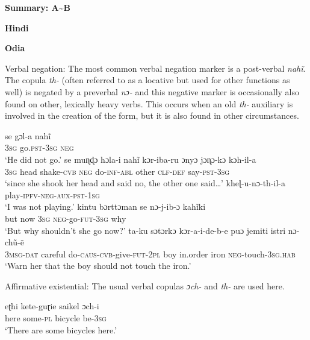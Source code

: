 \documentclass[output=paper]{langsci/langscibook}
\begin{document}
\begin{unindented}
\textbf{Summary: A{\textasciitilde}B}

\textbf{Hindi} \parencite[see][]{Bashir2006}

\textbf{Odia} \parencite{NeukomPatnaik2003}

Verbal negation: The most common verbal negation marker is a post-verbal \textit{nahĩ}. The copula \textit{th-} (often referred to as a locative but used for other functions as well) is negated by a preverbal \textit{nɔ-} and this negative marker is occasionally also found on other, lexically heavy verbs. This occurs when an old \textit{th-} auxiliary is involved in the creation of the form, but it is also found in other circumstances.
%
\begin{exe}\ex \gll se gɔl-a nahĩ \\
\textsc{3sg}   go.\textsc{pst-3sg}  \textsc{neg} \\
    \glt `He did not go.' \parencite[340]{NeukomPatnaik2003}
\ex \gll se muɳɖɔ hɔla-i nahĩ kɔr-iba-ru ɔnyɔ jɔɳɔ-kɔ kɔh-il-a \\
\textsc{3sg} head shake-\textsc{cvb} \textsc{neg} do-\textsc{inf-abl} other \textsc{clf-def} say-\textsc{pst-3sg} \\
    \glt `since she shook her head and said no, the other one
said…'\parencite[43]{NeukomPatnaik2003}
\ex \gll kheɭ-u-nɔ-th-il-a \\
play-\textsc{ipfv-neg-aux-pst-1sg} \\
    \glt `I was not playing.' \parencite[340]{NeukomPatnaik2003}
\ex \gll kintu bɔrttɔman se nɔ-j-ib-ɔ kahĩki \\
but now \textsc{3sg} \textsc{neg}-go-\textsc{fut-3sg} why \\
    \glt `But why shouldn't she go now?’ \parencite[341]{NeukomPatnaik2003}
\ex \gll ta-ku sɔtɔrkɔ kɔr-a-i-de-b-e puɔ jemiti istri nɔ-chũ-ẽ\\
\textsc{3msg-dat} careful do-\textsc{caus-cvb}-give-\textsc{fut-2pl} boy in.order iron \textsc{neg}-touch-\textsc{3sg.hab} \\
    \glt `Warn her that the boy should not touch the iron.' \parencite[155]{NeukomPatnaik2003}
    \end{exe}
%
Affirmative existential: The usual verbal copulas \textit{ɔch-} and \textit{th-} are used here.
%
\begin{exe}\ex \gll eʈhi kete-guɽie  saikel  ɔch-i   \\
here some-\textsc{pl}  bicycle be-\textsc{3sg} \\
    \glt `There are some bicycles here.' \parencite[47]{NeukomPatnaik2003}

\end{exe}
\end{unindented}
\end{document}

